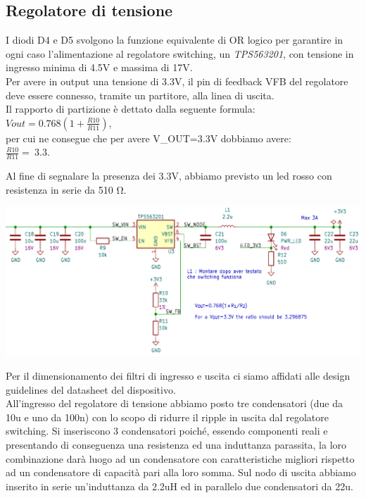\hypertarget{regolatore-di-tensione}{%
\subsection{\texorpdfstring{Regolatore di tensione}{Regolatore di tensione}}\label{regolatore-di-tensione}}

I diodi D4 e D5 svolgono la funzione equivalente di OR logico per garantire in ogni caso l’alimentazione al regolatore switching,
un \emph{TPS563201}, con tensione in ingresso minima di 4.5V e massima di 17V.\\
Per avere in output una tensione di 3.3V, il pin di feedback VFB del regolatore deve essere connesso, tramite un partitore, alla linea di uscita.\\
Il rapporto di partizione è dettato dalla seguente formula:\\
\(Vout = 0.768(1 + \frac{R10}{R11})\),\\
per cui ne consegue che per avere V\_OUT=3.3V dobbiamo avere:\\
\(\frac{R10}{R11} = \ 3.3\).

Al fine di segnalare la presenza dei 3.3V, abbiamo previsto un led rosso
con resistenza in serie da 510 Ω.

\begin{center}
\includegraphics[scale=0.35]{figures/image103.png}
\captionsetup{type=figure}
\end{center}

\noindent Per il dimensionamento dei filtri di ingresso e uscita ci siamo affidati alle 
design guidelines del datasheet del dispositivo.\\
All'ingresso del regolatore di tensione abbiamo posto tre condensatori
(due da 10u e uno da 100n) con lo scopo di ridurre il ripple in uscita dal regolatore switching. 
Si inseriscono 3 condensatori poiché, essendo
componenti reali e presentando di conseguenza una resistenza ed una
induttanza parassita, la loro combinazione darà luogo ad un condensatore
con caratteristiche migliori rispetto ad un condensatore di capacità
pari alla loro somma.
Sul nodo di uscita abbiamo inserito in serie 
un’induttanza da 2.2uH ed in parallelo due condensatori da 22u.

